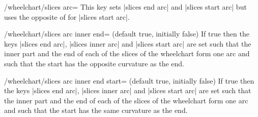 \documentclass[a4paper,english,dvipsnames]{ltxdoc}
\begin{document}
\begin{key}{/wheelchart/slices arc=}
This key sets |slices end arc| and |slices start arc| but uses the opposite of  for |slices start arc|.
\begin{codeexample}[width=10cm]
\begin{tikzpicture}
\wheelchart[
    slices arc={1}{0},
    wheel data=\WCcount,
    wheel data angle pos=1,
    wheel data pos=0.5,
    wheel data style={
        circle,
        fill=\WCvarB!50
    }
]{\exampleforthismanual}
\end{tikzpicture}
\end{codeexample}
\begin{codeexample}[width=10cm]
\end{codeexample}
\end{key}
\begin{key}{/wheelchart/slices arc inner end= (default true, initially false)}
If true then the keys |slices end arc|, |slices inner arc| and |slices start arc| are set such that the inner part and the end of each of the slices of the wheelchart form one arc and such that the start has the opposite curvature as the end.
\begin{codeexample}[width=10cm]
\end{codeexample}
\end{key}
\begin{key}{/wheelchart/slices arc inner end start= (default true, initially false)}
If true then the keys |slices end arc|, |slices inner arc| and |slices start arc| are set such that the inner part and the end of each of the slices of the wheelchart form one arc and such that the start has the same curvature as the end.
\begin{codeexample}[]
\end{codeexample}
\end{key}
\end{document}
